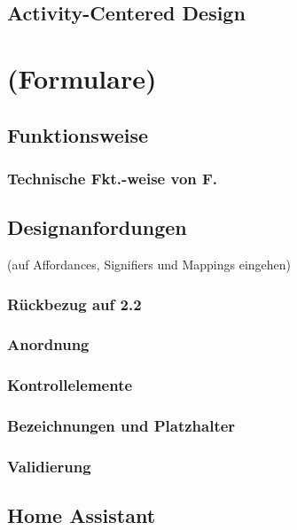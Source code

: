 \documentclass[oneside,a4paper,11pt,openright]{report}
\begin{document}
\subsection{Activity-Centered Design}

\clearpage
\section{(Formulare)}
\cite{wroblewskiWebForm2008}
\subsection{Funktionsweise}
\subsubsection{Technische Fkt.-weise von F.}
\subsection{Designanfordungen}
\cite{normanDesignEveryday2013} (auf Affordances, Signifiers und Mappings eingehen)
\subsubsection{Rückbezug auf 2.2}
\subsubsection{Anordnung}
\subsubsection{Kontrollelemente}
\subsubsection{Bezeichnungen und Platzhalter}
\subsubsection{Validierung}

\clearpage



% 



\clearpage

\subsection{Home Assistant}
\end{document}
